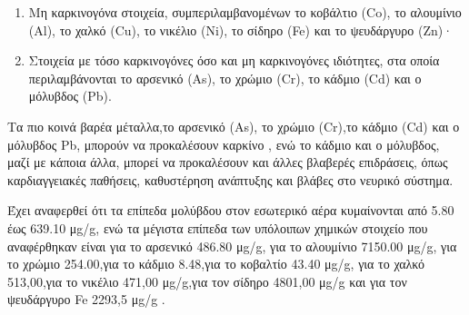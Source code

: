\begin{enumerate}
    \item Μη καρκινογόνα στοιχεία, συμπεριλαμβανομένων το κοβάλτιο (Co), το αλουμίνιο (Al), το χαλκό (Cu), το νικέλιο (Ni), το σίδηρο (Fe) και το ψευδάργυρο (Zn)·
    \item Στοιχεία με τόσο καρκινογόνες όσο και μη καρκινογόνες ιδιότητες, στα οποία περιλαμβάνονται το αρσενικό (As), το χρώμιο (Cr), το κάδμιο (Cd) και ο μόλυβδος (Pb). 
\end{enumerate}

Τα πιο κοινά βαρέα μέταλλα,το αρσενικό (As), το χρώμιο (Cr),το κάδμιο (Cd) και ο μόλυβδος Pb, μπορούν να προκαλέσουν καρκίνο , ενώ το κάδμιο και ο μόλυβδος, μαζί με κάποια άλλα, μπορεί να προκαλέσουν και άλλες βλαβερές επιδράσεις, όπως καρδιαγγειακές παθήσεις, καθυστέρηση ανάπτυξης και βλάβες στο νευρικό σύστημα.

Έχει αναφερθεί ότι τα επίπεδα μολύβδου στον εσωτερικό αέρα κυμαίνονται από 5.80 έως 639.10 μg/g, ενώ τα μέγιστα επίπεδα των υπόλοιπων χημικών στοιχείο που αναφέρθηκαν είναι για το αρσενικό 486.80 μg/g, για το αλουμίνιο 7150.00 μg/g, για το χρώμιο 254.00,για το κάδμιο 8.48,για το κοβαλτίο  43.40 μg/g, για το χαλκό 513,00,για το νικέλιο 471,00 μg/g,για τον σίδηρο 4801,00 μg/g και για τον ψευδάργυρο Fe 2293,5 μg/g \cite{ijerph17082927}.
